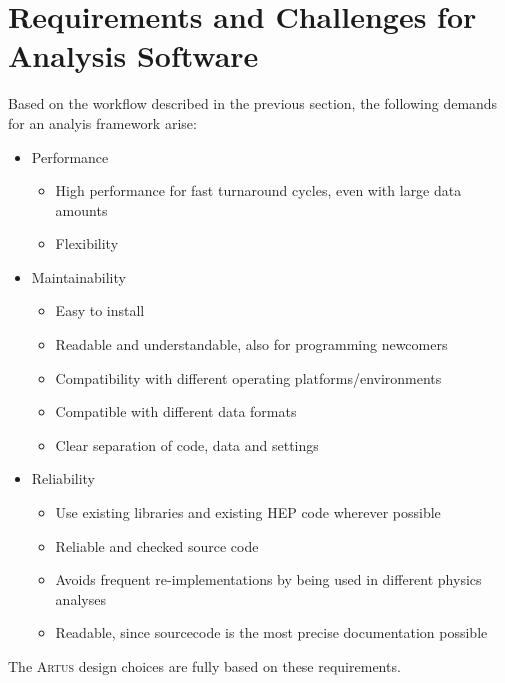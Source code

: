 \documentclass[3p]{elsarticle}
\newcommand{\software}[1]{\textsc{#1}\xspace}
\newcommand{\artus}{\software{Artus}}
\begin{document}
\section{Requirements and Challenges for Analysis Software\label{section_artus_challenges}}
Based on the workflow described in the previous section, the following demands for an analyis framework arise:
\begin{itemize}
 \item Performance
 \begin{itemize}
  \item High performance for fast turnaround cycles, even with large data amounts %
  \item Flexibility %
 \end{itemize}
 \item Maintainability
 \begin{itemize}
  \item Easy to install
  \item Readable and understandable, also for programming newcomers
  \item Compatibility with different operating platforms/environments %
  \item Compatible with different data formats %
  \item Clear separation of code, data and settings %
 \end{itemize}

 \item Reliability
 \begin{itemize}
  \item Use existing libraries and existing HEP code wherever possible %
  \item Reliable and checked source code %
  \item Avoids frequent re-implementations by being used in different physics analyses %
  \item Readable, since sourcecode is the most precise documentation possible
 \end{itemize}
\end{itemize}

The \artus design choices are fully based on these requirements.
\end{document}
